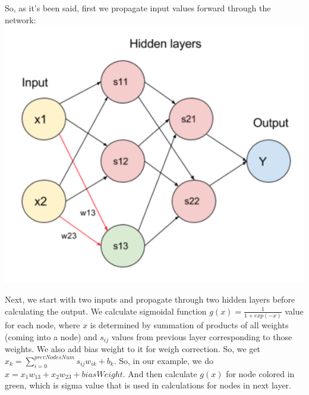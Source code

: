 \documentclass[12pt, letterpaper]{article}
\begin{document}
\begin{enumerate}[label=\Roman*.]
	So, as it's been said, first we propagate input values forward through the network:
	{\center \includegraphics[scale=.9]{2.png} \\}
	
	Next, we start with two inputs and propagate through two hidden layers before calculating the output. We calculate sigmoidal function \(g(x) = \frac{1}{1 + exp(-x)}\) value for each node, where \(x\) is determined by summation of products of all weights (coming into a node) and \(s_{ij}\) values from previous layer corresponding to those weights. We also add bias weight to it for weigh correction. So, we get \( x_k = \sum\limits_{i=0}^{prevNodesNum} s_{ij}w_{ik}+b_k \). So, in our example, we do \(x = x_1w_{13} + x_2w_{23} + biasWeight\). And then calculate \(g(x)\) for node colored in green, which is sigma value that is used in calculations for nodes in next layer. \\
	

\end{enumerate}
\end{document}
